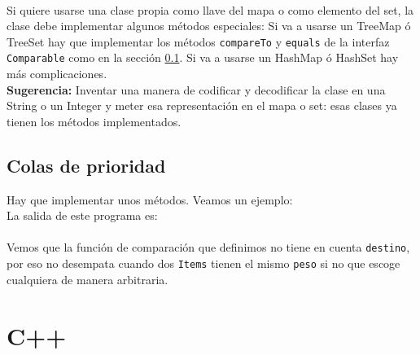 \documentclass[10pt,letterpaper]{article}
\begin{document}
\ttfamily 
{}
\\ \normalfont\normalsize
\bigskip 
Si quiere usarse una clase propia como llave del mapa o como elemento del set, la clase debe implementar
algunos métodos especiales: Si va a usarse un TreeMap ó TreeSet hay que implementar los métodos \texttt{compareTo} y 
\texttt{equals} de la interfaz \texttt{Comparable} como en la sección \ref{colas_de_prioridad_java}. Si va a usarse
un HashMap ó HashSet hay más complicaciones.\\
\smallskip
\textbf{Sugerencia:} Inventar una manera de codificar y decodificar la clase en una String o un Integer y meter esa representación en el mapa o set: esas clases ya tienen los métodos implementados.

\subsection{Colas de prioridad}
\label{colas_de_prioridad_java}
Hay que implementar unos métodos. Veamos un ejemplo: \\
\bigskip
La salida de este programa es: \\

\ttfamily 
{}
\\ \normalfont\normalsize
\medskip
Vemos que la función de comparación que definimos no tiene en cuenta \texttt{destino},
por eso no desempata cuando dos \texttt{Items} tienen el mismo \texttt{peso} si no que escoge
cualquiera de manera arbitraria.

\section{C++}
\end{document}
